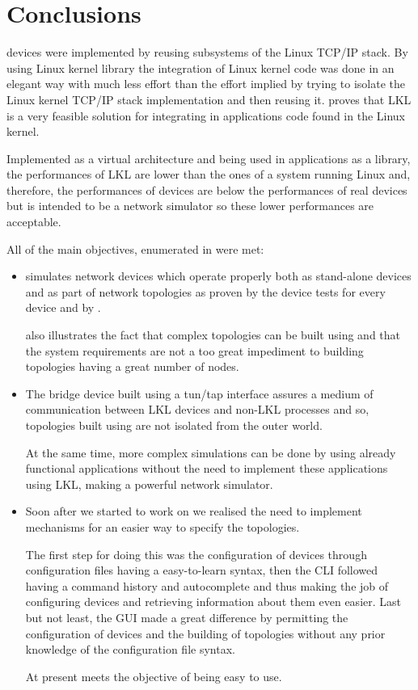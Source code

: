 \chapter{Conclusions}
\label{chapter:conclusions}

\project devices were implemented by reusing subsystems of the Linux TCP/IP stack. By using Linux kernel library the integration of Linux kernel code was done in an elegant way with much less effort than the effort implied by trying to isolate the Linux kernel TCP/IP stack implementation and then reusing it. \project proves that LKL is a very feasible solution for integrating in applications code found in the Linux kernel.

Implemented as a virtual architecture and being used in applications as a library, the performances of LKL are lower than the ones of a system running Linux and, therefore, the performances of \project devices are below the performances of real devices but \project is intended to be a network simulator so these lower performances are acceptable.

All of the main objectives, enumerated in  were met:
\begin{itemize}
\item \project simulates network devices which operate properly both as stand-alone devices and as part of network topologies as proven by the device tests for every device and by .

 also illustrates the fact that complex topologies can be built using \project and that the system requirements are not a too great impediment to building topologies having a great number of nodes.
\item The bridge device built using a tun/tap interface assures a medium of communication between LKL devices and non-LKL processes and so, topologies built using \project are not isolated from the outer world. 

At the same time, more complex simulations can be done by using already functional applications without the need to implement these applications using LKL, making \project a powerful network simulator.
\item  Soon after we started to work on \project we realised the need to implement mechanisms for an easier way to specify the topologies.

The first step for doing this was the configuration of devices through configuration files having a easy-to-learn syntax, then the CLI followed having a command history and autocomplete and thus making the job of configuring devices and retrieving information about them even easier. Last but not least, the GUI made a great difference by permitting the configuration of devices and the building of topologies without any prior knowledge of the configuration file syntax.

At present \project meets the objective of being easy to use. 
\end{itemize}

